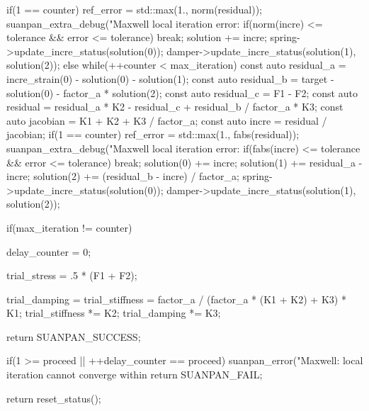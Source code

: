 \begin{cppcode}
{{{            if(1 == counter) ref_error = std::max(1., norm(residual));
            suanpan_extra_debug("Maxwell local iteration error: %
            if(norm(incre) <= tolerance && error <= tolerance) break;
            solution += incre;
            spring->update_incre_status(solution(0));
            damper->update_incre_status(solution(1), solution(2));
        }
    }
    else
        while(++counter < max_iteration) {
            const auto residual_a = incre_strain(0) - solution(0) - solution(1);
            const auto residual_b = target - solution(0) - factor_a * solution(2);
            const auto residual_c = F1 - F2;
            const auto residual = residual_a * K2 - residual_c + residual_b / factor_a * K3;
            const auto jacobian = K1 + K2 + K3 / factor_a;
            const auto incre = residual / jacobian;
            if(1 == counter) ref_error = std::max(1., fabs(residual));
            suanpan_extra_debug("Maxwell local iteration error: %
            if(fabs(incre) <= tolerance && error <= tolerance) break;
            solution(0) += incre;
            solution(1) += residual_a - incre;
            solution(2) += (residual_b - incre) / factor_a;
            spring->update_incre_status(solution(0));
            damper->update_incre_status(solution(1), solution(2));
        }

    if(max_iteration != counter) {
        delay_counter = 0;

        trial_stress = .5 * (F1 + F2);

        trial_damping = trial_stiffness = factor_a / (factor_a * (K1 + K2) + K3) * K1;
        trial_stiffness *= K2;
        trial_damping *= K3;

        return SUANPAN_SUCCESS;
    }

    if(1 >= proceed || ++delay_counter == proceed) {
        suanpan_error("Maxwell: local iteration cannot converge within %
        return SUANPAN_FAIL;
    }

    return reset_status();
}
\end{cppcode}